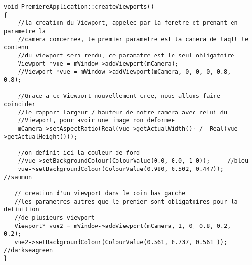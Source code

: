 \begin{lstlisting}[caption={PremiereApplication.cpp: ajout d'une méthode pour la gestion de lumière et des ombres}]
void PremiereApplication::createViewports()
{
    //la creation du Viewport, appelee par la fenetre et prenant en parametre la
    //camera concernee, le premier parametre est la camera de laqll le contenu
    //du viewport sera rendu, ce paramatre est le seul obligatoire
    Viewport *vue = mWindow->addViewport(mCamera);
    //Viewport *vue = mWindow->addViewport(mCamera, 0, 0, 0, 0.8, 0.8);

    //Grace a ce Viewport nouvellement cree, nous allons faire coincider
    //le rapport largeur / hauteur de notre camera avec celui du
    //Viewport, pour avoir une image non deformee
    mCamera->setAspectRatio(Real(vue->getActualWidth()) /  Real(vue->getActualHeight()));

    //on definit ici la couleur de fond
    //vue->setBackgroundColour(ColourValue(0.0, 0.0, 1.0));     //bleu
    vue->setBackgroundColour(ColourValue(0.980, 0.502, 0.447)); //saumon

   // creation d'un viewport dans le coin bas gauche
   //les parametres autres que le premier sont obligatoires pour la definition
   //de plusieurs viewport
   Viewport* vue2 = mWindow->addViewport(mCamera, 1, 0, 0.8, 0.2, 0.2);
   vue2->setBackgroundColour(ColourValue(0.561, 0.737, 0.561 ));  //darkseagreen
}


\end{lstlisting}



